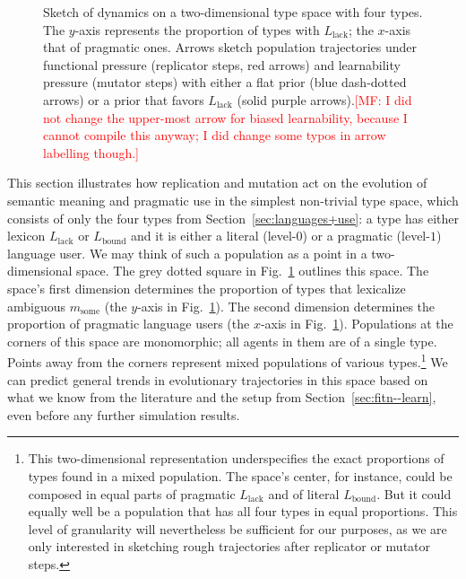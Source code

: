 \documentclass[a4paper, 11pt]{article}
\theoremstyle{Satz}
\newcommand{\mf}[1]{\textcolor{Red}{[MF: #1]}}
\newcommand{\mylang}[1]{\ensuremath{L_{\text{#1}}}\xspace} %
\newcommand{\messg}{\ensuremath{m}\xspace}		%
\newcommand{\mymessg}[1]{\ensuremath{\messg_{\text{#1}}}\xspace} %
\newcommand{\msome}{\mymessg{some}}
\newcommand{\Lbound}{\mylang{bound}}
\newcommand{\Llack}{\mylang{lack}}
\begin{document}
\begin{figure}

\caption{Sketch of dynamics on a two-dimensional type space with four types. The $y$-axis
  represents the proportion of types with $\Llack$; the $x$-axis that of pragmatic ones. Arrows
  sketch population trajectories under functional pressure (replicator steps, red arrows) and
  learnability pressure (mutator steps) with either a flat prior (blue dash-dotted arrows) or a
  prior that favors $\Llack$ (solid purple arrows).\mf{I did not change the upper-most arrow
    for biased learnability, because I cannot compile this anyway; I did change some typos in
    arrow labelling though.}}
\label{fig:sketch}
\end{figure}

This section illustrates how replication and mutation act on the evolution of semantic meaning
and pragmatic use in the simplest non-trivial type space, which consists of only the four types
from Section~\ref{sec:languages+use}: a type has either lexicon $\Llack$ or $\Lbound$ and it is
either a literal (level-$0$) or a pragmatic (level-$1$) language user. We may think of such a
population as a point in a two-dimensional space. The grey dotted square in
Fig.~\ref{fig:sketch} outlines this space. The space's first dimension determines the
proportion of types that lexicalize ambiguous $\msome$ (the $y$-axis in
Fig.~\ref{fig:sketch}). The second dimension determines the proportion of pragmatic language
users (the $x$-axis in Fig.~\ref{fig:sketch}). Populations at the corners of this space are
monomorphic; all agents in them are of a single type. Points away from the corners represent
mixed populations of various types.\footnote{This two-dimensional representation underspecifies
  the exact proportions of types found in a mixed population. The space's center, for instance,
  could be composed in equal parts of pragmatic $\Llack$ and of literal $\Lbound$. But it could
  equally well be a population that has all four types in equal proportions. This level of
  granularity will nevertheless be sufficient for our purposes, as we are only interested in
  sketching rough trajectories after replicator or mutator steps.} We can predict general
trends in evolutionary trajectories in this space based on what we know from the literature and
the setup from Section~\ref{sec:fitn--learn}, even before any further simulation results.
\end{document}
